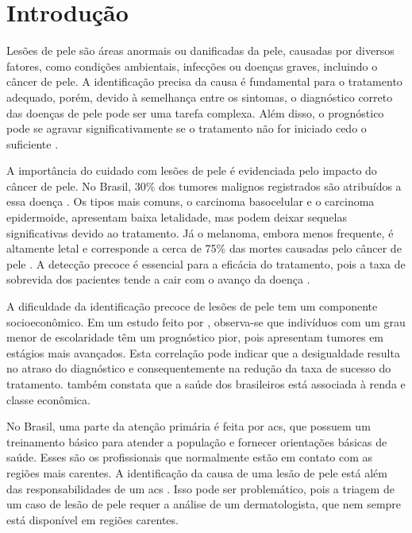 \section{Introdução}

Lesões de pele são áreas anormais ou danificadas da pele, causadas por diversos fatores, como condições ambientais,
infecções ou doenças graves, incluindo o câncer de pele. A identificação precisa da causa é fundamental para o
tratamento adequado, porém, devido à semelhança entre os sintomas, o diagnóstico correto das doenças de pele pode ser
uma tarefa complexa. Além disso, o prognóstico pode se agravar significativamente se o tratamento não for iniciado
cedo o suficiente \cite{habif2015clinical}.

A importância do cuidado com lesões de pele é evidenciada pelo impacto do câncer de pele. No Brasil, 30\% dos tumores
malignos registrados são atribuídos a essa doença \cite{skin_cancer_in_brazil}. Os tipos mais comuns, o carcinoma
basocelular e o carcinoma epidermoide, apresentam baixa letalidade, mas podem deixar sequelas significativas devido ao
tratamento. Já o melanoma, embora menos frequente, é altamente letal e corresponde a cerca de 75\% das mortes causadas
pelo câncer de pele \cite{skin_cancer_screening}. A detecção precoce é essencial para a eficácia do tratamento, pois a
taxa de sobrevida dos pacientes tende a cair com o avanço da doença \cite{skin_cancer_survival}.

A dificuldade da identificação precoce de lesões de pele tem um componente socioeconômico. Em um estudo feito por
\textcite{skin_cancer_socioeconomic}, observa-se que indivíduos com um grau menor de escolaridade têm um prognóstico
pior, pois apresentam tumores em estágios mais avançados. Esta correlação pode indicar que a desigualdade resulta no
atraso do diagnóstico e consequentemente na redução da taxa de sucesso do tratamento.
\textcite{santos2020desigualdades} também constata que a saúde dos brasileiros está associada à renda e classe
econômica.

No Brasil, uma parte da atenção primária é feita por \ac{acs}, que possuem um treinamento básico para atender a
população e fornecer orientações básicas de saúde. Esses são os profissionais que normalmente estão em contato com as
regiões mais carentes. A identificação da causa de uma lesão de pele está além das responsabilidades de um \ac{acs}
\cite{filgueiras2011agente}. Isso pode ser problemático, pois a triagem de um caso de lesão de pele requer a análise de
um dermatologista, que nem sempre está disponível em regiões carentes.


